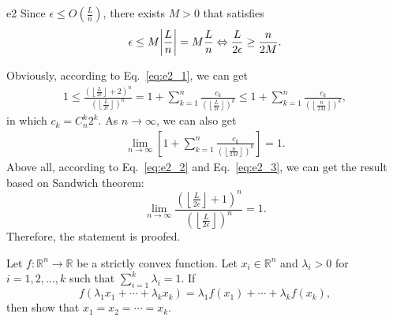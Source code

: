 \documentclass{article}
\begin{document}
\begin{PROOF}{e2}
	Since \(\epsilon \le O\left( \frac{L}{n} \right)\), there exists \(M > 0\) that satisfies
    \begin{equation}\label{eq:e2_1}
        \begin{aligned}
            \epsilon \le M \abs{\frac{L}{n}} = M \frac{L}{n} \Leftrightarrow \frac{L}{2\epsilon} \ge \frac{n}{2M}.
        \end{aligned}
    \end{equation}
        
    Obviously, according to Eq.~\ref{eq:e2_1}, we can get
    \begin{equation}\label{eq:e2_2}
        \begin{aligned}
            1 \le \frac{\left(\left\lfloor \frac{L}{2\epsilon} \right\rfloor + 2\right)^n}{\left(\left\lfloor \frac{L}{2\epsilon} \right\rfloor\right)^n} 
            = 1 + \sum_{k=1}^n\frac{c_k}{\left(\left\lfloor \frac{L}{2\epsilon} \right\rfloor\right)^k} 
            \le 1 + \sum_{k=1}^n\frac{c_k}{\left(\left\lfloor \frac{n}{2M} \right\rfloor\right)^k},
        \end{aligned}
    \end{equation}
    in which \(c_k = C_{n}^k 2^k\). As \(n \to \infty\), we can also get
    \begin{equation}\label{eq:e2_3}
        \begin{aligned}
            \lim_{n\to\infty}\left[1 + \sum_{k=1}^n\frac{c_k}{\left(\left\lfloor \frac{n}{2M} \right\rfloor\right)^k}\right] = 1.
        \end{aligned}
    \end{equation}
    Above all, according to Eq.~\ref{eq:e2_2} and Eq.~\ref{eq:e2_3}, we can get the result based on Sandwich theorem:
    \[
        \lim_{n \to \infty} \frac{\left(\left\lfloor \frac{L}{2\epsilon} \right\rfloor + 1\right)^n}{\left(\left\lfloor \frac{L}{2\epsilon} \right\rfloor\right)^n} = 1.
    \]
    Therefore, the statement is proofed.
\end{PROOF}


\begin{excercise}\label{e3}
Let $f: \mathbb{R}^n \rightarrow \mathbb{R}$ be a strictly convex function. Let $x_i \in \mathbb{R}^n$ and $\lambda_i > 0$ for $i = 1, 2, \ldots, k$ such that $\sum_{i=1}^{k} \lambda_i = 1$. If
\[
f(\lambda_1 x_1 + \cdots + \lambda_k x_k) = \lambda_1 f(x_1) + \cdots + \lambda_k f(x_k), 
\]
then show that $x_1 = x_2 = \cdots = x_k$.
\end{excercise}
\end{document}
